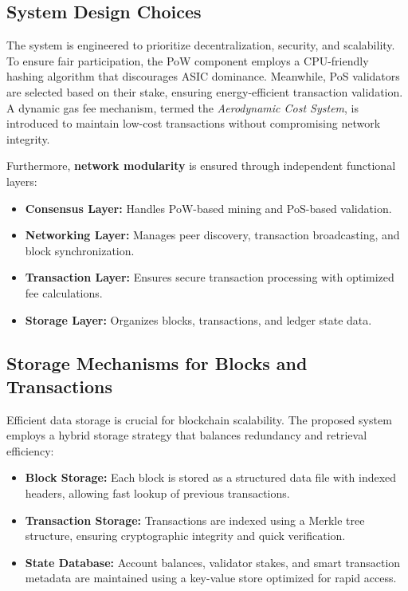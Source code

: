 \documentclass[conference]{IEEEtran}
\begin{document}
\subsection{System Design Choices}
The system is engineered to prioritize decentralization, security, and scalability. To ensure fair participation, the PoW component employs a CPU-friendly hashing algorithm that discourages ASIC dominance. Meanwhile, PoS validators are selected based on their stake, ensuring energy-efficient transaction validation. A dynamic gas fee mechanism, termed the \textit{Aerodynamic Cost System}, is introduced to maintain low-cost transactions without compromising network integrity.

Furthermore, \textbf{network modularity} is ensured through independent functional layers:
\begin{itemize}
    \item \textbf{Consensus Layer:} Handles PoW-based mining and PoS-based validation.
    \item \textbf{Networking Layer:} Manages peer discovery, transaction broadcasting, and block synchronization.
    \item \textbf{Transaction Layer:} Ensures secure transaction processing with optimized fee calculations.
    \item \textbf{Storage Layer:} Organizes blocks, transactions, and ledger state data.
\end{itemize}

\subsection{Storage Mechanisms for Blocks and Transactions}
Efficient data storage is crucial for blockchain scalability. The proposed system employs a hybrid storage strategy that balances redundancy and retrieval efficiency:

\begin{itemize}
    \item \textbf{Block Storage:} Each block is stored as a structured data file with indexed headers, allowing fast lookup of previous transactions.
    \item \textbf{Transaction Storage:} Transactions are indexed using a Merkle tree structure, ensuring cryptographic integrity and quick verification.
    \item \textbf{State Database:} Account balances, validator stakes, and smart transaction metadata are maintained using a key-value store optimized for rapid access.
\end{itemize}
\end{document}
